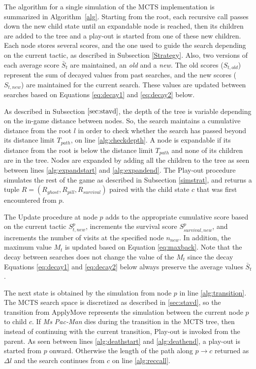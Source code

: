\documentclass[journal]{IEEEtran}
\begin{document}
The algorithm for a single simulation of the MCTS implementation is summarized in Algorithm~\ref{alg}. Starting from the root, each recursive call passes down the new child state until an expandable node is reached, then its children are added to the tree and a play-out is started from one of these new children. Each node stores several scores, and the one used to guide the search depending on the current tactic, as described in Subsection \ref{Strategy}. Also, two versions of each average score $\bar{S}_t$ are maintained, an \emph{old} and a \emph{new}. The old scores ($S_{t,old}$) represent the sum of decayed values from past searches, and the new scores ($S_{t,new}$) are maintained for the current search. These values are updated between searches based on Equations \ref{eq:decay1} and \ref{eq:decay2} below. %

As described in Subsection $\ref{sec:stavd}$, the depth of the tree is variable depending on the in-game distance between nodes. So, the search maintains a cumulative distance from the root $l$ in order to check whether the search has passed beyond its distance limit $T_{path}$, on line \ref{alg:checkdepth}. A node is expandable if its distance from the root is below the distance limit $T_{path}$ and none of its children are in the tree. Nodes are expanded by adding all the children to the tree as seen between lines \ref{alg:expandstart} and \ref{alg:expandend}. The {\sc Play-out} procedure simulates the rest of the game as described in Subsection \ref{simstrat}, and returns a tuple $R = (R_{ghost}, R_{pill}, R_{survival})$ paired with the child state $c$ that was first encountered from $p$. 

The {\sc Update} procedure at node $p$ adds to the appropriate cumulative score based on the current tactic $S^p_{t,new}$, increments the survival score $S^p_{survival,new}$, and increments the number of visits at the specified node $n_{new}$. In addition, the maximum value $M_t$ is updated based on Equation \ref{eq:maxback}. Note that the decay between searches does not change the value of the $M_t$ since the decay Equations \ref{eq:decay1} and \ref{eq:decay2} below always preserve the average values $\bar{S}_t$.

The next state is obtained by the simulation from node $p$ in line \ref{alg:transition}. The MCTS search space is discretized as described in \ref{sec:stavd}, so the transition from {\sc ApplyMove} represents the simulation between the current node $p$ to child $c$. If {\it{Ms Pac-Man}} dies during the transition in the MCTS tree, then instead of continuing with the current transition, {\sc Play-out} is invoked from the parent. As seen between lines \ref{alg:deathstart} and \ref{alg:deathend}, a play-out is started from $p$ onward. Otherwise the length of the path along $p \rightarrow c$ returned as $\Delta l$ and the search continues from $c$ on line \ref{alg:reccall}. %
\end{document}
